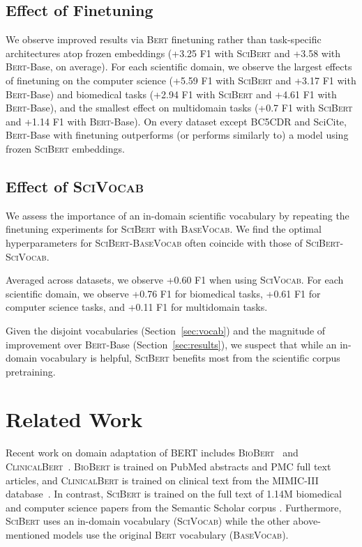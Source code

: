 \documentclass[11pt,a4paper]{article}
\newcommand{\bert}{\textsc{Bert}\xspace}
\newcommand{\scibert}{\textsc{SciBert}\xspace}
\newcommand{\biobert}{\textsc{BioBert}\xspace}
\newcommand{\clinicalbert}{\textsc{ClinicalBert}\xspace}
\newcommand{\basevocab}{\textsc{BaseVocab}\xspace}
\newcommand{\scivocab}{\textsc{SciVocab}\xspace}
\begin{document}
\subsection{Effect of Finetuning}

We observe improved results via \bert finetuning rather than task-specific architectures atop frozen embeddings (+3.25 F1 with \scibert and +3.58 with \bert-Base, on average).  For each scientific domain, we observe the largest effects of finetuning on the computer science (+5.59 F1 with \scibert and +3.17 F1 with \bert-Base) and biomedical tasks (+2.94 F1 with \scibert and +4.61 F1 with \bert-Base), and the smallest effect on multidomain tasks (+0.7 F1 with \scibert and +1.14 F1 with \bert-Base).  On every dataset except BC5CDR and SciCite, \bert-Base with finetuning outperforms (or performs similarly to) a model using frozen \scibert embeddings.

\subsection{Effect of \scivocab}

We assess the importance of an in-domain scientific vocabulary by repeating the finetuning experiments for \scibert with \basevocab.  We find the optimal hyperparameters for \scibert-\basevocab often coincide with those of \scibert-\scivocab.  

Averaged across datasets, we observe +0.60 F1 when using \scivocab.  For each scientific domain, we observe +0.76 F1 for biomedical tasks, +0.61 F1 for computer science tasks, and +0.11 F1 for multidomain tasks.  

Given the disjoint vocabularies (Section~\ref{sec:vocab}) and the magnitude of improvement over \bert-Base (Section~\ref{sec:results}), we suspect that while an in-domain vocabulary is helpful, \scibert benefits most from the scientific corpus pretraining.  







 
\section{Related Work}
Recent work on domain adaptation of BERT includes 
\biobert~\cite{Lee2019BioBERTAP} and \clinicalbert~\cite{Alsentzer2019PubliclyAC,clinicalbert}.
\biobert is trained on PubMed abstracts and PMC full text articles, and \clinicalbert is trained on clinical text from the MIMIC-III database~\cite{mimic}.
In contrast, \scibert is trained on the full text of 1.14M biomedical and computer science papers from the Semantic Scholar corpus \cite{ammar:18}. 
Furthermore, \scibert uses an in-domain vocabulary (\scivocab) while the other above-mentioned models use the original \bert vocabulary (\basevocab). 
\end{document}
